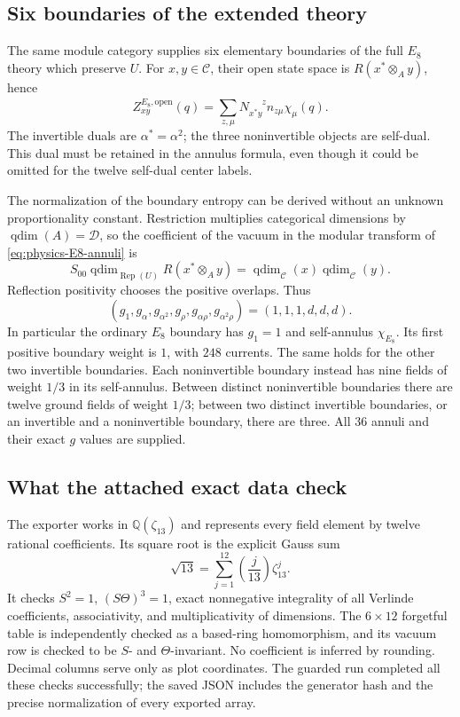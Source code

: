 \subsection{Six boundaries of the extended theory}

The same module category supplies six elementary boundaries of the full
$E_8$ theory which preserve $U$. For $x,y\in\mathcal C$, their open
state space is $R(x^*\otimes_A y)$, hence
\begin{equation}
 Z^{E_8,\mathrm{open}}_{xy}(q)
  =\sum_{z,\mu}N_{x^*y}^{\phantom{x^*y}z}
                  n_{z\mu}\chi_\mu(q).
 \label{eq:physics-E8-annuli}
\end{equation}
The invertible duals are $\alpha^*=\alpha^2$; the three noninvertible
objects are self-dual. This dual must be retained in the annulus formula,
even though it could be omitted for the twelve self-dual center labels.

The normalization of the boundary entropy can be derived without an
unknown proportionality constant. Restriction multiplies categorical
dimensions by $\operatorname{qdim}(A)=\mathcal D$, so the coefficient
of the vacuum in the modular transform of
\eqref{eq:physics-E8-annuli} is
\[
 S_{00}\operatorname{qdim}_{\operatorname{Rep}(U)}
       R(x^*\otimes_A y)
 =\operatorname{qdim}_{\mathcal C}(x)
       \operatorname{qdim}_{\mathcal C}(y).
\]
Reflection positivity chooses the positive overlaps. Thus
\begin{equation}
 (g_1,g_\alpha,g_{\alpha^2},g_\rho,g_{\alpha\rho},g_{\alpha^2\rho})
   =(1,1,1,d,d,d).
 \label{eq:physics-E8-g}
\end{equation}
In particular the ordinary $E_8$ boundary has $g_1=1$ and self-annulus
$\chi_{E_8}$. Its first positive boundary weight is $1$, with $248$
currents. The same holds for the other two invertible boundaries.
Each noninvertible boundary instead has nine fields of weight $1/3$
in its self-annulus. Between distinct noninvertible boundaries there
are twelve ground fields of weight $1/3$; between two distinct
invertible boundaries, or an invertible and a noninvertible boundary,
there are three. All $36$ annuli and their exact $g$ values are supplied.

\subsection{What the attached exact data check}

The exporter  works in
$\mathbb Q(\zeta_{13})$ and represents every field element by twelve
rational coefficients. Its square root is the explicit Gauss sum
\[
 \sqrt{13}=\sum_{j=1}^{12}\left(\frac j{13}\right)\zeta_{13}^j.
\]
It checks $S^2=1$, $(S\Theta)^3=1$, exact nonnegative integrality of
all Verlinde coefficients, associativity, and multiplicativity of
dimensions. The $6\times12$ forgetful table is independently checked
as a based-ring homomorphism, and its vacuum row is checked to be
$S$- and $\Theta$-invariant. No coefficient is inferred by rounding.
Decimal columns serve only as plot coordinates.
The guarded run completed all these checks successfully; the saved
JSON includes the generator hash and the precise normalization of
every exported array.


